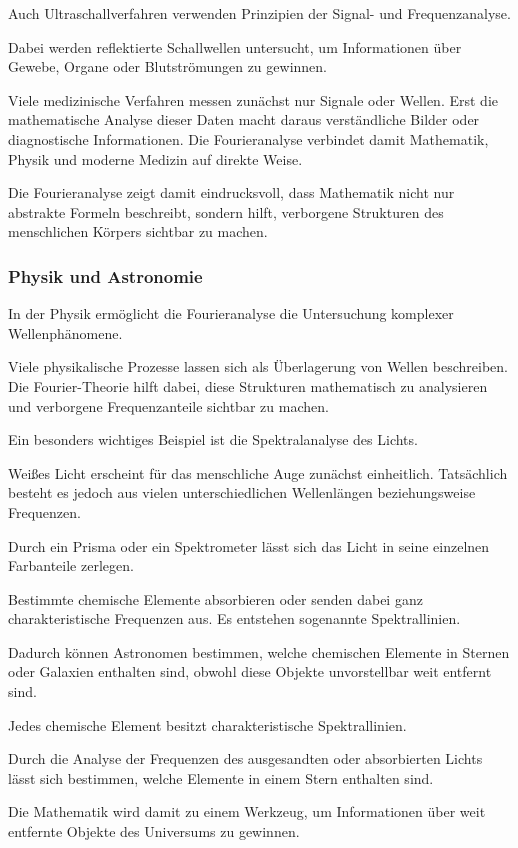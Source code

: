 Auch Ultraschallverfahren verwenden Prinzipien der Signal- und Frequenzanalyse.

Dabei werden reflektierte Schallwellen untersucht,
um Informationen über Gewebe,
Organe
oder Blutströmungen zu gewinnen.

Viele medizinische Verfahren messen zunächst nur Signale oder Wellen.
Erst die mathematische Analyse dieser Daten
macht daraus verständliche Bilder oder diagnostische Informationen.
Die Fourieranalyse verbindet damit Mathematik,
Physik
und moderne Medizin auf direkte Weise.

Die Fourieranalyse zeigt damit eindrucksvoll,
dass Mathematik nicht nur abstrakte Formeln beschreibt,
sondern hilft,
verborgene Strukturen des menschlichen Körpers sichtbar zu machen.

\subsubsection*{Physik und Astronomie}

In der Physik ermöglicht die Fourieranalyse die Untersuchung komplexer Wellenphänomene.

Viele physikalische Prozesse lassen sich als Überlagerung von Wellen beschreiben.
Die Fourier-Theorie hilft dabei,
diese Strukturen mathematisch zu analysieren
und verborgene Frequenzanteile sichtbar zu machen.

\medskip

Ein besonders wichtiges Beispiel ist die Spektralanalyse des Lichts.

Weißes Licht erscheint für das menschliche Auge zunächst einheitlich.
Tatsächlich besteht es jedoch aus vielen unterschiedlichen Wellenlängen beziehungsweise Frequenzen.

Durch ein Prisma oder ein Spektrometer
lässt sich das Licht in seine einzelnen Farbanteile zerlegen.

Bestimmte chemische Elemente absorbieren oder senden dabei ganz charakteristische Frequenzen aus.
Es entstehen sogenannte Spektrallinien.

Dadurch können Astronomen bestimmen,
welche chemischen Elemente in Sternen oder Galaxien enthalten sind,
obwohl diese Objekte unvorstellbar weit entfernt sind.

\begin{PhysicsBox}
	\small
	\label{box:fourier-spektrallinien-signatur}
	Jedes chemische Element besitzt charakteristische Spektrallinien.
	
	Durch die Analyse der Frequenzen des ausgesandten oder absorbierten Lichts
	lässt sich bestimmen,
	welche Elemente in einem Stern enthalten sind.
	
	Die Mathematik wird damit zu einem Werkzeug,
	um Informationen über weit entfernte Objekte des Universums zu gewinnen.
\end{PhysicsBox}

